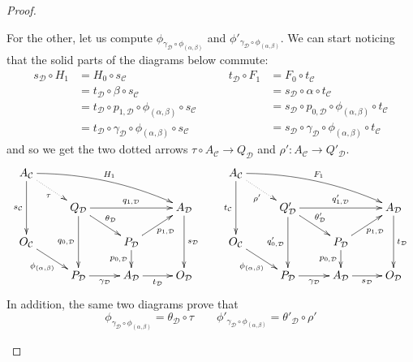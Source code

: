 \documentclass[a4paper,UKenglish,cleveref,pdftex,thm-restate,numberwithinsect]{lipics-v2021}
\begin{document}
\begin{proof}
\begin{enumerate}
\begin{itemize}
				For the other, let us compute $\phi_{\gamma_{\mathcal{D}}\circ \phi_{(\alpha, \beta)}}$ and $\phi'_{\gamma_{\mathcal{D}}\circ \phi_{(\alpha, \beta)}}$. We can start noticing that the solid parts of the diagrams below commute:
				\[\begin{split}
					s_{\mathcal{D}}\circ H_1&=H_0\circ s_{\mathcal{C}}\\&= t_{\mathcal{D}} \circ \beta \circ s_{\mathcal{C}}\\&=t_{\mathcal{D}}\circ p_{1, \mathcal{D}} \circ \phi_{(\alpha, \beta)} \circ s_{\mathcal{C}}\\&=t_{\mathcal{D}}\circ \gamma_{\mathcal{D}}\circ  \phi_{(\alpha, \beta)} \circ s_{\mathcal{C}}
				\end{split} \qquad \begin{split}
				t_{\mathcal{D}}\circ F_1&=F_0\circ t_{\mathcal{C}}\\&= s_{\mathcal{D}} \circ \alpha \circ t_{\mathcal{C}}\\&=s_{\mathcal{D}}\circ p_{0, \mathcal{D}} \circ \phi_{(\alpha, \beta)} \circ t_{\mathcal{C}}\\&=s_{\mathcal{D}}\circ \gamma_{\mathcal{D}}\circ  \phi_{(\alpha, \beta)} \circ t_{\mathcal{C}}
				\end{split}\]
		and so we get the two dotted arrows $\tau \circ A_{\mathcal{C}}\to Q_{\mathcal{D}}$ and $\rho'\colon A_{\mathcal{C}}\to Q'_{\mathcal{D}}$.
				 \[\xymatrix@C=26pt@R=15pt{ A_{\mathcal{C}} \ar[dd]_{s_{\mathcal{C}}}\ar@/^.3cm/[drrr]^{H_1} \ar@{.>}[dr]_{\tau} & & & & A_{\mathcal{C}} \ar[dd]_{t_{\mathcal{C}}} \ar@{.>}[dr]_{\rho'}\ar@/^.3cm/[drrr]^{F_1}\\& Q_{\mathcal{D}} \ar[rr]^{q_{1, \mathcal{D}}}  \ar[dd]_{q_{0, \mathcal{D}}} \ar[dr]^{\theta_{\mathcal{D}}}& & A_{\mathcal{D}} \ar[dd]^{s_{\mathcal{D}}} & & Q'_{\mathcal{D}} \ar[rr]^{q'_{1, \mathcal{D}}}  \ar[dd]_{q'_{0, \mathcal{D}}} \ar[dr]^{\theta'_{\mathcal{D}}}& & A_{\mathcal{D}} \ar[dd]^{t_{\mathcal{D}}}\\ O_{\mathcal{C}} \ar[dr]_{\phi_{(\alpha, \beta)}} &&  P_{\mathcal{D}} \ar[ur]_{p_{1, \mathcal{D}}} \ar[d]_{p_{0, \mathcal{D}}}&&  O_{\mathcal{C}} \ar[dr]_{\phi_{(\alpha, \beta)}}  &&  P_{\mathcal{D}} \ar[ur]_{p_{1, \mathcal{D}}} \ar[d]_{p_{0, \mathcal{D}}}\\ & P_{\mathcal{D}} \ar[r]_{\gamma_{\mathcal{D}}}& A_{\mathcal{D}} \ar[r]_{t_{\mathcal{D}}} & O_{\mathcal{D}} &  & P_{\mathcal{D}}\ar[r]_{\gamma_{\mathcal{D}}}& A_{\mathcal{D}} \ar[r]_{s_{\mathcal{D}}} & O_{\mathcal{D}}}\]
			In addition, the same two diagrams prove that
			\[\phi_{\gamma_{\mathcal{D}}\circ \phi_{(\alpha, \beta)}}= \theta_{\mathcal{D}}\circ \tau \qquad  \phi'_{\gamma_{\mathcal{D}}\circ \phi_{(\alpha, \beta)}} = \theta'_{\mathcal{D}} \circ \rho'\]
			

\end{itemize}
\end{enumerate}
\end{proof}
\end{document}
